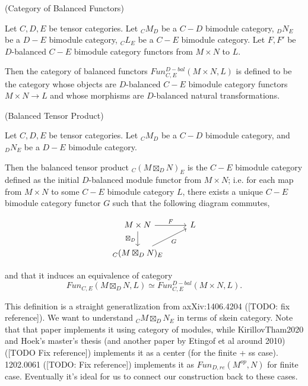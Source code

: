 \begin{definition} (Category of Balanced Functors)

  \noindent Let $C, D, E$ be tensor categories. Let $_{C}M_{D}$ be a $C-D$
  bimodule category, $_{D}N_{E}$ be a $D-E$ bimodule category, $_{C}L_{E}$ be
  a $C-E$ bimodule category. Let $F, F'$ be $D$-balanced $C-E$ bimodule
  category functors from $M \times N$ to $L$.

  \noindent Then the category of balanced functors
  $Fun^{D-bal}_{C,E}(M \times N, L)$ is defined to be the category whose
  objects are $D$-balanced $C-E$ bimodule category functors $M \times N \to L$
  and whose morphisms are $D$-balanced natural transformations.
\end{definition}

\begin{definition} (Balanced Tensor Product)

  \noindent Let $C, D, E$ be tensor categories. Let $_{C}M_{D}$ be a $C-D$
  bimodule category, and $_{D}N_{E}$ be a $D-E$ bimodule category.

  \noindent Then the balanced tensor product $_{C}(M \boxtimes_{D} N)_{E}$ is
  the $C-E$ bimodule category defined as the initial $D$-balanced module
  functor from $M \times N$; i.e. for each map from $M \times N$ to some $C-E$
  bimodule category $L$, there exists a unique $C-E$ bimodule category functor
  $G$ such that the following diagram commutes,

  \[
    \begin{tikzcd}
      M \times N \arrow[r, "F"] \arrow[d, "\boxtimes_{D}"'] & L \\
      _{C}(M \boxtimes_{D} N)_{E} \arrow[ur, "G"']
    \end{tikzcd}
  \]

  \noindent and that it induces an equivalence of category
  \[Fun_{C,E}(M \boxtimes_{D} N, L) \simeq Fun_{C,E}^{D-bal}(M \times N, L).\]
\end{definition}

\begin{remark}
  This definition is a straight generatlization from axXiv:1406.4204 ([TODO: fix reference]). We want
  to understand $_{C}M \boxtimes_{D} N_{E}$ in terms of skein category. Note
  that that paper implements it using category of modules, while
  KirillovTham2020 and Hoek's master's thesis (and another paper by Etingof et
  al around 2010) ([TODO Fix reference]) implements it as a center (for the finite + ss case).
  1202.0061 ([TODO: Fix reference]) implements it as $Fun_{D,re}(M^{op},N)$ for finite case.
  Eventually it's ideal for us to connect our construction back to these
  cases.
\end{remark}

